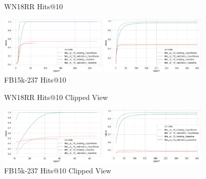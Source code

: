 
\begin{figure}[H]
	\parbox{.5\linewidth}{
   		\caption{WN18RR Hits@10}
   		\centering
    		\includegraphics[width=0.45\textwidth, height=0.2\textheight]{WN18RR_hits_at_10_Results}
		}
	\hfill
	\parbox{.5\linewidth}{
		\caption{FB15k-237 Hits@10}
   		\centering
		\includegraphics[width=0.45\textwidth, height=0.2\textheight]{FB15k-237_hits_at_10_Results}
		}
\end{figure}

\begin{figure}[H]
	\parbox{.5\linewidth}{
   		\caption{WN18RR Hits@10 Clipped View}
   		\centering
    		\includegraphics[width=0.45\textwidth, height=0.2\textheight]{WN18RR_hits_at_10_Results_Clipped}
		}
	\hfill
	\parbox{.5\linewidth}{
		\caption{FB15k-237 Hits@10  Clipped View}
   		\centering
		\includegraphics[width=0.45\textwidth, height=0.2\textheight]{FB15k-237_hits_at_10_Results_Clipped}
		}
\end{figure}


